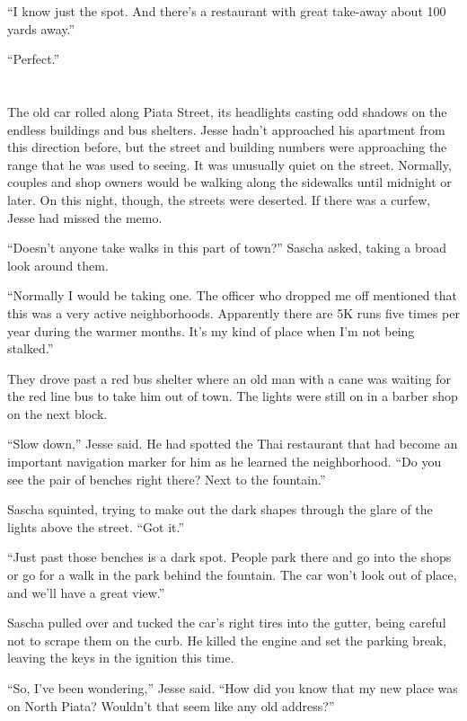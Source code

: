 \documentclass[12pt]{book}
\begin{document}
``I know just the spot.  And there's a restaurant with great take-away about 100 yards away.''

``Perfect.''

\chapter{}

The old car rolled along Piata Street, its headlights casting odd shadows on the endless buildings and bus shelters.  Jesse hadn't approached his apartment from this direction before, but the street and building numbers were approaching the range that he was used to seeing.  It was unusually quiet on the street.  Normally, couples and shop owners would be walking along the sidewalks until midnight or later.  On this night, though, the streets were deserted.  If there was a curfew, Jesse had missed the memo.

``Doesn't anyone take walks in this part of town?'' Sascha asked, taking a broad look around them.

``Normally I would be taking one.  The officer who dropped me off mentioned that this was a very active neighborhoods.  Apparently there are 5K runs five times per year during the warmer months.  It's my kind of place when I'm not being stalked.''

They drove past a red bus shelter where an old man with a cane was waiting for the red line bus to take him out of town.  The lights were still on in a barber shop on the next block.

``Slow down,'' Jesse said.  He had spotted the Thai restaurant that had become an important navigation marker for him as he learned the neighborhood.  ``Do you see the pair of benches right there?  Next to the fountain.''

Sascha squinted, trying to make out the dark shapes through the glare of the lights above the street.  ``Got it.''

``Just past those benches is a dark spot.  People park there and go into the shops or go for a walk in the park behind the fountain.  The car won't look out of place, and we'll have a great view.''

Sascha pulled over and tucked the car's right tires into the gutter, being careful not to scrape them on the curb.  He killed the engine and set the parking break, leaving the keys in the ignition this time.

``So, I've been wondering,'' Jesse said.  ``How did you know that my new place was on North Piata?  Wouldn't that seem like any old address?''
\end{document}
